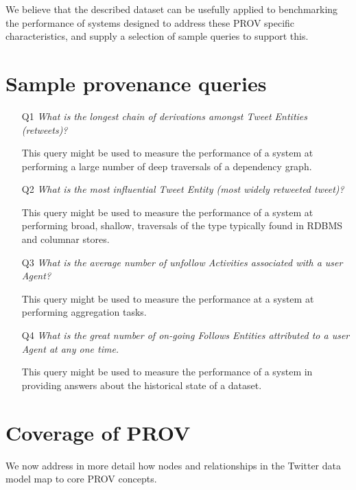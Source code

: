 \documentclass{llncs2e/llncs}
\begin{document}
%
We believe that the described dataset can be usefully applied to benchmarking the performance of systems designed to address these PROV specific characteristics, and supply a selection of sample queries to support this.
%
\section{Sample provenance queries}
%
\begin{enumerate}
    \item[Q1] \textit{What is the longest chain of derivations amongst Tweet Entities (retweets)?}
    
    This query might be used to measure the performance of a system at performing a large number of deep traversals of a dependency graph. 
    
    \item[Q2] \textit{What is the most influential Tweet Entity (most widely retweeted tweet)?}
    
    This query might be used to measure the performance of a system at performing broad, shallow, traversals of the type typically found in RDBMS and columnar stores.
     
    \item[Q3] \textit{What is the average number of unfollow Activities associated with a user Agent?}
    
    This query might be used to measure the performance at a system at performing aggregation tasks.
     
    \item[Q4] \textit{What is the great number of on-going Follows Entities attributed to a user Agent at any one time.}
    
    This query might be used to measure the performance of a system in providing answers about the historical state of a dataset.
    
\end{enumerate}
%
\section{Coverage of PROV}
%
We now address in more detail how nodes and relationships in the Twitter data model map to core PROV concepts.
%
\end{document}
